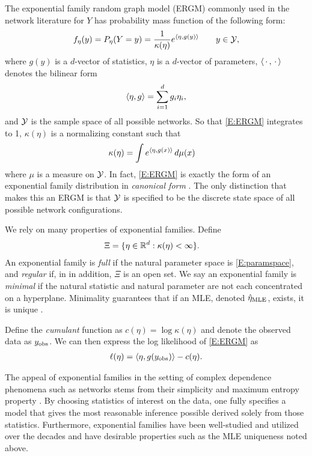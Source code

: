 The exponential family random graph model (ERGM) commonly used in the network 
literature for $Y$ has probability mass function of the following form:
\begin{align}
	f_\eta(y) = P_{\eta}(Y=y) = \frac{1}{ \kappa( \eta) } e^{ \langle  \eta, g(y) \rangle  } \qquad y \in {\mathcal Y}, \label{E:ERGM}
\end{align}
where $g(y)$ is a $d$-vector of statistics, $\eta$ is a $d$-vector of parameters, 
$\langle \,\cdot\,,\,\cdot\, \rangle$ denotes the bilinear form
\begin{align*}
	\langle  \eta, g  \rangle = \sum_{i=1}^d g_i \eta_i,
\end{align*}
and ${\mathcal Y}$ is the sample space of all possible networks.
So that \eqref{E:ERGM} integrates to 1, $\kappa(\eta)$ is a normalizing constant such that
\begin{align}
   \kappa(\eta) &= \int e^{ \langle  \eta, g(x) \rangle  } \, d \mu(x) \label{E:kappa}
\end{align}
where $\mu$ is a measure on ${\mathcal Y}$.  In fact, \eqref{E:ERGM} is exactly the form of 
an exponential family distribution in \emph{canonical form} \citep[Chapter 1.4]{tpe}.  The only distinction that makes this an ERGM is that ${\mathcal Y}$ is specified to be the 
discrete state space of all possible network configurations.

We rely on many properties of exponential families.  Define 
\begin{align}
   \Xi &= \{ \eta \in {\mathbb R}^d : \kappa(\eta) < \infty \}.  \label{E:paramspace}
\end{align}
An exponential family is \emph{full} if the natural parameter  space is 
\eqref{E:paramspace}, and \emph{regular} if, in in addition, $\Xi$ is an open set.
We say an exponential family is \emph{minimal} if the natural statistic and 
natural parameter are not each concentrated on a hyperplane. 
Minimality guarantees that if an MLE, denoted $\hat{\eta}_{\textrm{MLE}}$, exists, 
it is unique \citep{Geyer:gdor}.


Define the \emph{cumulant} function as $c(\eta) = \log \kappa(\eta)$ and
denote the observed data as $y_{\text{obs}}$.  We can then express 
the log likelihood of \eqref{E:ERGM} as
\begin{align}
	\ell( \eta ) = \langle  \eta, g(y_{\text{obs}}) \rangle - c( \eta). \label{E:loglike}
\end{align}

The appeal of exponential families in the setting of complex dependence phenomena such 
as networks stems from their simplicity and maximum entropy property 
\citep{Jaynes:1978,Geyer:1992}.
By choosing statistics of interest on the data, one fully specifies a model that gives 
the 
most reasonable inference possible derived solely from those statistics.  
Furthermore, exponential families have been 
well-studied \citep{Barndorff,Brown:1986} and utilized over the decades and have 
desirable properties such as the MLE uniqueness noted above.

